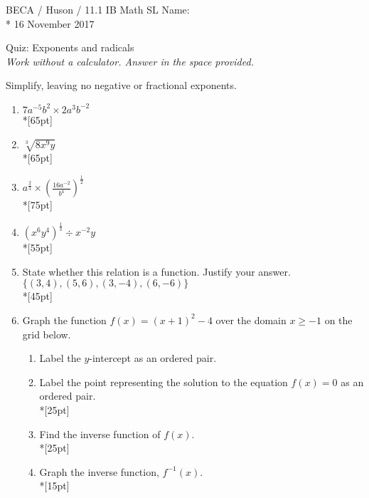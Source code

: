 \documentclass[]{book}
\begin{document}
\noindent BECA / Huson / 11.1 IB Math SL \hspace{2in} Name:\\*
16 November 2017
\begin{center}
{\Large Quiz: Exponents and radicals}\\
\textit{Work without a calculator. Answer in the space provided.}
\end{center}



Simplify, leaving no negative or fractional exponents.

\begin{enumerate}

\item $7a^{-5}b^2 \times 2a^3 b^{-2}$\\*[65pt]
\item $\sqrt[3]{8x^9 y}$\\*[65pt]
\item $\displaystyle a^{\frac{2}{3}} \times (\frac{16 a^{-2}}{b^4})^{\frac{1}{2}}$\\*[75pt]
\item $\displaystyle (x^6 y^4)^{\frac{1}{3}} \div x^{-2} y$\\*[55pt]

\newpage
\item State whether this relation is a function. Justify your answer. $\{(3, 4),(5,6), (3, -4), (6, -6)\}$\\*[45pt]
\item Graph the function $f(x) = (x+1)^2 - 4$ over the domain $x \geq -1$ on the grid below. 
\begin{enumerate}
    \item Label the $y$-intercept as an ordered pair.
    \item Label the point representing the solution to the equation $f(x)=0$ as an ordered pair.\\*[25pt]
    \item Find the inverse function of $f(x)$.\\*[25pt]
    \item Graph the inverse function, $f^{-1}(x)$.\\*[15pt]
\end{enumerate}

\begin{figure}[!htbp]
\begin{center}
\begin{tikzpicture}


\end{tikzpicture}
\end{center}
\end{figure}
\end{enumerate}
\end{document}

